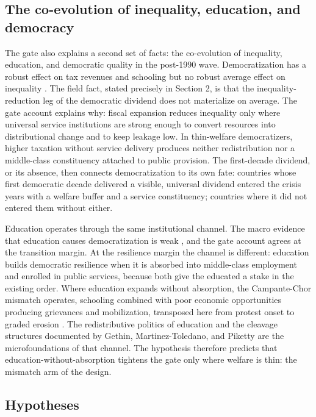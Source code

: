\documentclass[11pt,letterpaper]{article}
\begin{document}
\subsection{The co-evolution of inequality, education, and democracy}

The gate also explains a second set of facts: the co-evolution of inequality, education, and democratic quality in the post-1990 wave. Democratization has a robust effect on tax revenues and schooling but no robust average effect on inequality \citep{AcemogluNaidu2015}. The field fact, stated precisely in Section 2, is that the inequality-reduction leg of the democratic dividend does not materialize on average. The gate account explains why: fiscal expansion reduces inequality only where universal service institutions are strong enough to convert resources into distributional change and to keep leakage low. In thin-welfare democratizers, higher taxation without service delivery produces neither redistribution nor a middle-class constituency attached to public provision. The first-decade dividend, or its absence, then connects democratization to its own fate: countries whose first democratic decade delivered a visible, universal dividend entered the crisis years with a welfare buffer and a service constituency; countries where it did not entered them without either.

Education operates through the same institutional channel. The macro evidence that education causes democratization is weak \citep{AcemogluJohnson2005}, and the gate account agrees at the transition margin. At the resilience margin the channel is different: education builds democratic resilience when it is absorbed into middle-class employment and enrolled in public services, because both give the educated a stake in the existing order. Where education expands without absorption, the Campante-Chor mismatch operates, schooling combined with poor economic opportunities producing grievances and mobilization, transposed here from protest onset to graded erosion \citep{CampanteChor2012}. The redistributive politics of education \citep{Ansell2010} and the cleavage structures documented by Gethin, Martinez-Toledano, and Piketty \citep{Gethin2022} are the microfoundations of that channel. The hypothesis therefore predicts that education-without-absorption tightens the gate only where welfare is thin: the mismatch arm of the design.

\subsection{Hypotheses}
\end{document}

